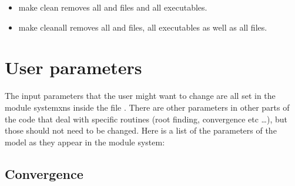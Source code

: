 \documentclass[letterpaper,10pt,english]{sphinxmanual}
\begin{document}
\begin{itemize}
\begin{sphinxVerbatim}[commandchars=\\\{\}]
makecleanmakeparspacempirun\PYGZhy{}nNUMBER\PYGZus{}OF\PYGZus{}PROCESSES./XNS\PYGZhy{}mpi
\end{sphinxVerbatim}

\sphinxAtStartPar
Note that it must be NUMBER\_OF\_PROCESSES\(\geq\)2, because one process is always only passing initial conditions to the other processes, and NUMBER\_OF\_PROCESSES\sphinxhyphen{}1\(\leq\)(NOMG+1)\(\times\)(NRHO1+1)\(\times\)(NKB+1), that is the number of computing processes must not be larger than the number of models to be computed.


\item {} 
\sphinxAtStartPar
make clean \sphinxhyphen{} removes all  and  files and all executables.


\item {} 
\sphinxAtStartPar
make cleanall \sphinxhyphen{} removes all  and  files, all executables as well as all  files.

\end{itemize}

\sphinxstepscope


\chapter{User parameters}
\label{\detokenize{user_params:user-parameters}}\label{\detokenize{user_params::doc}}
\sphinxAtStartPar
The input parameters that the user might want to change are all set in the module systemxns inside the file . There are other parameters in other parts of the code that deal with specific routines (root finding, convergence etc …), but those should not need to be changed. Here is a list of the parameters of the model as they appear in the module system:


\section{Convergence}
\label{\detokenize{user_params:convergence}}
\end{document}

